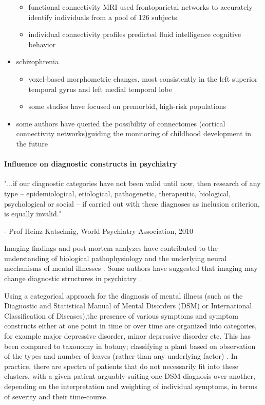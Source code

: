 \begin{itemize}
	\begin{itemize}
		\item
		functional connectivity MRI used frontoparietal networks to accurately identify individuals from a pool of 126 subjects.
		\item
		individual connectivity profiles predicted fluid intelligence cognitive behavior
	\end{itemize}
	\item
	schizophrenia
	
	\begin{itemize}
		\item
		voxel-based morphometric changes, most consistently in the left superior temporal gyrus and left medial temporal lobe 
		\item
		some studies have focused on premorbid, high-risk populations 
	\end{itemize}
	\item
	some authors have queried the possibility of connectomes (cortical connectivity networks)guiding the monitoring of childhood development in the future 
\end{itemize}


\paragraph{Influence on diagnostic constructs in psychiatry}

"...if our diagnostic categories have not been valid until now, then research of any type -- epidemiological, etiological, pathogenetic, therapeutic, biological, psychological or social -- if carried out with these diagnoses as inclusion criterion, is equally invalid."

- Prof Heinz Katschnig, World Psychiatry Association, 2010 

Imaging findings and post-mortem analyzes have contributed to the understanding of biological pathophysiology and the underlying neural mechanisms of mental illnesses . Some authors have suggested that imaging may change diagnostic structures in psychiatry .

Using a categorical approach for the diagnosis of mental illness (such as the Diagnostic and Statistical Manual of Mental Disorders (DSM) or International Classification of Diseases),the presence of various symptoms and symptom constructs either at one point in time or over time are organized into categories, for example major depressive disorder, minor depressive disorder etc. This has been compared to taxonomy in botany; classifying a plant based on observation of the types and number of leaves (rather than any underlying factor) . In practice, there are spectra of patients that do not necessarily fit into these clusters, with a given patient arguably suiting one DSM diagnosis over another, depending on the interpretation and weighting of individual symptoms, in terms of severity and their time-course.

